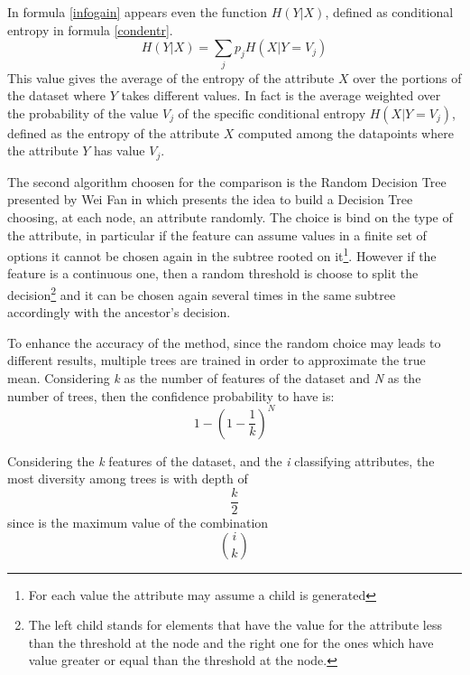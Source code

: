 \documentclass{acm_proc_article-sp-sigmod07}
\begin{document}
In formula \ref{infogain} appears even the function $H(Y|X)$, defined as
conditional entropy in formula \ref{condentr}.
\begin{equation}
H(Y|X) = \sum_{j} p_j H(X| Y  = V_j)
\label{condentr}
\end{equation}
This value gives the average of the entropy of the attribute $X$ over the
portions of the dataset where $Y$ takes different values.
In fact is the average weighted over the probability of the value $V_j$ of
the specific conditional entropy $H(X| Y  = V_j)$, defined as the entropy
of the attribute $X$ computed among the datapoints where the attribute $Y$
has value $V_j$. 

The second algorithm choosen for the comparison is the Random Decision
Tree presented by Wei Fan in \cite{fan:rdt} which presents the idea to
build a Decision Tree choosing, at each node, an attribute randomly. The
choice is bind on the type of the attribute, in particular if the feature
can assume values in a finite set of options it cannot be chosen again in
the subtree rooted on it\footnote{For each value the attribute may assume
a child is generated}. However if the feature is a continuous one, then
a random threshold is choose to split the decision\footnote{The left child
stands for elements that have the value for the attribute less than the
threshold at the node and the right one for the ones which have value
greater or equal than the threshold at the node.} and it can be chosen
again several times in the same subtree accordingly with the ancestor's
decision.

To enhance the accuracy of the method, since the random choice may
leads to different results, multiple trees are trained in order to
approximate the true mean. Considering \emph{k} as the number of features
of the dataset and \emph{N} as the number of trees, then the confidence
probability to have is:
\begin{equation}
\label{formula:confidence}
1 - ( 1 - \frac{1}{k})^N
\end{equation}

Considering the \emph{k} features of the dataset, and the \emph{i}
classifying attributes, the most diversity among trees is with depth of 
\begin{equation}
\label{fig:depth}
\frac{k}{2} 
\end{equation}
since is the maximum value of the combination
\begin{equation}
 {{i}\choose{k}}
\end{equation}
\end{document}

